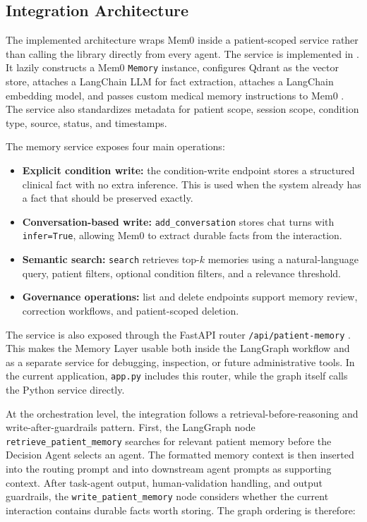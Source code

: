 \subsection{Integration Architecture}

The implemented architecture wraps Mem0 inside a patient-scoped service rather than calling the library directly from every agent. The service is implemented in . It lazily constructs a Mem0 \texttt{Memory} instance, configures Qdrant as the vector store, attaches a LangChain LLM for fact extraction, attaches a LangChain embedding model, and passes custom medical memory instructions to Mem0 \cite{mem0_paper,mem0_docs_overview,qdrant_doc,langchain_doc}. The service also standardizes metadata for patient scope, session scope, condition type, source, status, and timestamps.

The memory service exposes four main operations:

\begin{itemize}
    \item \textbf{Explicit condition write:} the condition-write endpoint stores a structured clinical fact with no extra inference. This is used when the system already has a fact that should be preserved exactly.
    \item \textbf{Conversation-based write:} \texttt{add\_conversation} stores chat turns with \texttt{infer=True}, allowing Mem0 to extract durable facts from the interaction.
    \item \textbf{Semantic search:} \texttt{search} retrieves top-$k$ memories using a natural-language query, patient filters, optional condition filters, and a relevance threshold.
    \item \textbf{Governance operations:} list and delete endpoints support memory review, correction workflows, and patient-scoped deletion.
\end{itemize}

The service is also exposed through the FastAPI router \texttt{/api/patient-memory} \cite{fastapi_doc}. This makes the Memory Layer usable both inside the LangGraph workflow and as a separate service for debugging, inspection, or future administrative tools. In the current application, \texttt{app.py} includes this router, while the graph itself calls the Python service directly.

At the orchestration level, the integration follows a retrieval-before-reasoning and write-after-guardrails pattern. First, the LangGraph node \texttt{retrieve\_patient\_memory} searches for relevant patient memory before the Decision Agent selects an agent. The formatted memory context is then inserted into the routing prompt and into downstream agent prompts as supporting context. After task-agent output, human-validation handling, and output guardrails, the \texttt{write\_patient\_memory} node considers whether the current interaction contains durable facts worth storing. The graph ordering is therefore:

